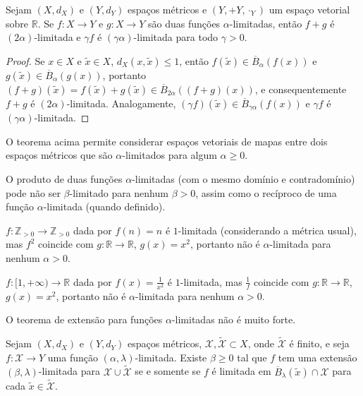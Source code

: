 \begin{theorem}
  Sejam $(X, d_X)$ e $(Y, d_Y)$ espaços métricos e $(Y, +Y, \cdot_Y)$ um espaço vetorial sobre $\mathbb{R}$. Se $f : X \to Y$ e $g : X \to Y$ são duas funções $\alpha$-limitadas, então $f + g$ é $(2\alpha)$-limitada e $\gamma f$ é $(\gamma \alpha)$-limitada para todo $\gamma > 0$.
\end{theorem}
\begin{proof}
  Se $x \in X$ e $\tilde{x} \in X$, $d_X(x, \tilde{x}) \le 1$, então $f(\tilde{x}) \in \overline{B}_{\alpha}(f(x))$ e $g(\tilde{x}) \in \overline{B}_{\alpha}(g(x))$, portanto $(f + g)(\tilde{x}) = f(\tilde{x}) + g(\tilde{x}) \in \overline{B}_{2\alpha}((f + g)(x))$, e consequentemente $f + g$ é $(2\alpha)$-limitada. Analogamente, $(\gamma f)(\tilde{x}) \in \overline{B}_{\gamma \alpha}(f(x))$ e $\gamma f$ é $(\gamma \alpha)$-limitada.
\end{proof}

O teorema acima permite considerar espaços vetoriais de mapas entre dois espaços métricos que são $\alpha$-limitados para algum $\alpha \ge 0$.

O produto de duas funções $\alpha$-limitadas (com o mesmo domínio e contradomínio) pode não ser $\beta$-limitado para nenhum $\beta > 0$, assim como o recíproco de uma função $\alpha$-limitada (quando definido).

\begin{example}
  $f : \mathbb{Z}_{> 0} \to \mathbb{Z}_{> 0}$ dada por $f(n) = n$ é $1$-limitada (considerando a métrica usual), mas $f^2$ coincide com $g : \mathbb{R} \to \mathbb{R}$, $g(x) = x^2$, portanto não é $\alpha$-limitada para nenhum $\alpha > 0$.
\end{example}

\begin{example}
  $f : [1, +\infty) \to \mathbb{R}$ dada por $f(x) = \frac{1}{x^2}$ é $1$-limitada, mas $\frac{1}{f}$ coincide com $g : \mathbb{R} \to \mathbb{R}$, $g(x) = x^2$, portanto não é $\alpha$-limitada para nenhum $\alpha > 0$.
\end{example}

O teorema de extensão para funções $\alpha$-limitadas não é muito forte.

\begin{theorem} \label{tietze}
  Sejam $(X,d_X)$ e $(Y, d_Y)$ espaços métricos, $\mathcal{X}, \tilde{\mathcal{X}} \subset X$, onde $\tilde{\mathcal{X}}$ é finito, e seja $f : \mathcal{X} \to Y$ uma função $(\alpha,\lambda)$-limitada. Existe $\beta \ge 0$ tal que $f$ tem uma extensão $(\beta,\lambda)$-limitada para $\mathcal{X} \cup \tilde{\mathcal{X}}$ se e somente se $f$ é limitada em $\overline{B}_{\lambda}(\tilde{x}) \cap \mathcal{X}$ para cada $\tilde{x} \in \tilde{\mathcal{X}}$.
\end{theorem}

